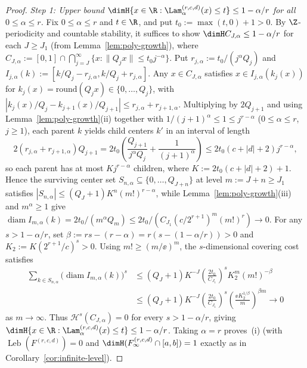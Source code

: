 \begin{proof}
\emph{Step 1: Upper bound $\dimH\{x\in\R:\Lam_\alpha^{(r,c,d)}(x)\le t\}\le1-\alpha/r$
for all $0\le\alpha\le r$.} Fix $0\le\alpha\le r$ and $t\in\R$, and put
$t_0:=\max(t,0)+1>0$. By $\Z$-periodicity and countable stability, it suffices to
show $\dimH C_{J,\alpha}\le1-\alpha/r$ for each $J\ge J_1$ (from
Lemma~\ref{lem:poly-growth}), where
$C_{J,\alpha}:=[0,1]\cap\bigcap_{j=J}^\infty\{x:\|Q_jx\|\le t_0j^{-\alpha}\}$.
Put $r_{j,\alpha}:=t_0/(j^\alpha Q_j)$ and
$I_{j,\alpha}(k):=[k/Q_j-r_{j,\alpha},k/Q_j+r_{j,\alpha}]$. Any $x\in C_{J,\alpha}$
satisfies $x\in I_{j,\alpha}(k_j(x))$ for $k_j(x)=\mathrm{round}(Q_jx)\in\{0,\dots,Q_j\}$,
with $|k_j(x)/Q_j-k_{j+1}(x)/Q_{j+1}|\le r_{j,\alpha}+r_{j+1,\alpha}$. Multiplying
by $2Q_{j+1}$ and using Lemma~\ref{lem:poly-growth}(ii) together with
$1/(j+1)^\alpha\le1\le j^{r-\alpha}$ ($0\le\alpha\le r$, $j\ge1$), each parent
$k$ yields child centers $k'$ in an interval of length
\[
2(r_{j,\alpha}+r_{j+1,\alpha})Q_{j+1}
=2t_0\left(\frac{Q_{j+1}}{j^\alpha Q_j}+\frac{1}{(j+1)^\alpha}\right)
\le 2t_0(c+|d|+2)j^{r-\alpha},
\]
so each parent has at most $Kj^{r-\alpha}$ children, where $K:=2t_0(c+|d|+2)+1$.
Hence the surviving center set $S_{n,\alpha}\subseteq\{0,\dots,Q_{J+n}\}$ at
level $m:=J+n\ge J_1$ satisfies
$|S_{n,\alpha}|\le(Q_J+1)K^n(m!)^{r-\alpha}$, while
Lemma~\ref{lem:poly-growth}(iii) and $m^\alpha\ge1$ give
$\operatorname{diam}I_{m,\alpha}(k)=2t_0/(m^\alpha Q_m)\le2t_0/(C_{J_1}(c/2^{r+1})^m(m!)^r)\to0$.
For any $s>1-\alpha/r$, set $\beta:=rs-(r-\alpha)=r(s-(1-\alpha/r))>0$ and
$K_2:=K(2^{r+1}/c)^s>0$. Using $m!\ge(m/\ee)^m$, the $s$-dimensional covering
cost satisfies
\begin{align*}
\sum_{k\in S_{n,\alpha}}\bigl(\operatorname{diam}I_{m,\alpha}(k)\bigr)^s
&\le(Q_J+1)K^{-J}\left(\frac{2t_0}{C_{J_1}}\right)^s K_2^m(m!)^{-\beta}\\
&\le(Q_J+1)K^{-J}\left(\frac{2t_0}{C_{J_1}}\right)^s
\left(\frac{\ee K_2^{1/\beta}}{m}\right)^{\beta m}\longrightarrow0
\end{align*}
as $m\to\infty$. Thus $\mathcal H^s(C_{J,\alpha})=0$ for every $s>1-\alpha/r$,
giving $\dimH\{x\in\R:\Lam_\alpha^{(r,c,d)}(x)\le t\}\le1-\alpha/r$. Taking
$\alpha=r$ proves~(i) (with $\operatorname{Leb}(F^{(r,c,d)})=0$ and
$\dimH(F_\infty^{(r,c,d)}\cap[a,b])=1$ exactly as in Corollary~\ref{cor:infinite-level}).


\end{proof}
